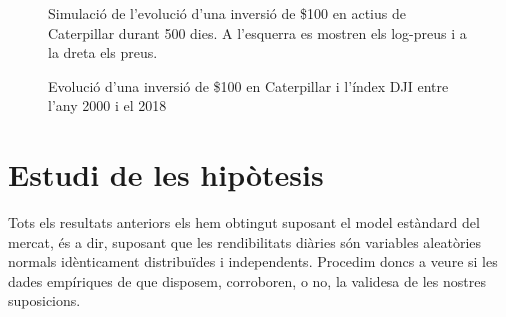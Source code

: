 \documentclass{article}
\numberwithin{table}{section}
\numberwithin{figure}{section}
\numberwithin{equation}{section}
\begin{document}
\begin{figure}[htb]
	\centering \sffamily \small
	
	\caption{Simulació de l'evolució d'una inversió de \$100 en actius de Caterpillar durant 500 dies. A l'esquerra es mostren els log-preus i a la dreta els preus.}
	\label{fig:simulacio}
\end{figure}

\begin{figure}[H]
	\centering \sffamily \small
	
	\caption{Evolució d'una inversió de \$100 en Caterpillar i l'índex DJI entre l'any 2000 i el 2018}
	\label{fig:inversio}
\end{figure}
\newpage

\section{Estudi de les hipòtesis}
Tots els resultats anteriors els hem obtingut suposant el model estàndard del mercat, és a dir, suposant que les rendibilitats diàries són variables aleatòries normals idènticament distribuïdes i independents. Procedim doncs a veure si les dades empíriques de que disposem, corroboren, o no, la validesa de les nostres suposicions.
\end{document}
